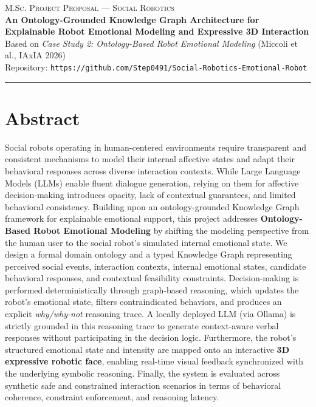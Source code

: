 \documentclass[11pt,a4paper]{article}
\begin{document}
\begin{flushleft}
    {\small\textsc{M.Sc. Project Proposal --- Social Robotics}} \\[6pt]
    {\LARGE\bfseries An Ontology-Grounded Knowledge Graph Architecture for Explainable Robot Emotional Modeling and Expressive 3D Interaction} \\[8pt]
    {\small Based on \textit{Case Study 2: Ontology-Based Robot Emotional Modeling} (Miccoli et al., IAxIA 2026)} \\[4pt]
    {\small Repository: \texttt{https://github.com/Step0491/Social-Robotics-Emotional-Robot}}
\end{flushleft}

\vspace{4pt}
\noindent\rule{\textwidth}{0.5pt}
\vspace{8pt}

\section*{Abstract}
Social robots operating in human-centered environments require transparent and consistent mechanisms to model their internal affective states and adapt their behavioral responses across diverse interaction contexts. While Large Language Models (LLMs) enable fluent dialogue generation, relying on them for affective decision-making introduces opacity, lack of contextual guarantees, and limited behavioral consistency. Building upon an ontology-grounded Knowledge Graph framework for explainable emotional support, this project addresses \textbf{Ontology-Based Robot Emotional Modeling} by shifting the modeling perspective from the human user to the social robot's simulated internal emotional state. We design a formal domain ontology and a typed Knowledge Graph representing perceived social events, interaction contexts, internal emotional states, candidate behavioral responses, and contextual feasibility constraints. Decision-making is performed deterministically through graph-based reasoning, which updates the robot's emotional state, filters contraindicated behaviors, and produces an explicit \textit{why/why-not} reasoning trace. A locally deployed LLM (via Ollama) is strictly grounded in this reasoning trace to generate context-aware verbal responses without participating in the decision logic. Furthermore, the robot's structured emotional state and intensity are mapped onto an interactive \textbf{3D expressive robotic face}, enabling real-time visual feedback synchronized with the underlying symbolic reasoning. Finally, the system is evaluated across synthetic safe and constrained interaction scenarios in terms of behavioral coherence, constraint enforcement, and reasoning latency.
\end{document}
